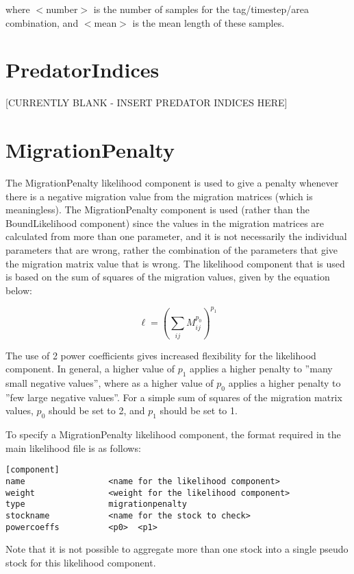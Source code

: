 \documentclass [a4paper, 10pt]{book}
\begin{document}
where $<$number$>$ is the number of samples for the tag/timestep/area combination, and $<$mean$>$ is the mean length of these samples.

\section{PredatorIndices}\label{sec:predatorindex}
[CURRENTLY BLANK - INSERT PREDATOR INDICES HERE]

\section{MigrationPenalty}\label{sec:migpenalty}
The MigrationPenalty likelihood component is used to give a penalty whenever there is a negative migration value from the migration matrices (which is meaningless).  The MigrationPenalty component is used (rather than the BoundLikelihood component) since the values in the migration matrices are calculated from more than one parameter, and it is not necessarily the individual parameters that are wrong, rather the combination of the parameters that give the migration matrix value that is wrong.  The likelihood component that is used is based on the sum of squares of the migration values, given by the equation below:

\begin{equation}\label{eq:migpenalty}
\ell = \left( \sum_{ij}^{} M_{ij}^{p_0} \right)^{p_1}
\end{equation}

\bigskip
The use of 2 power coefficients gives increased flexibility for the likelihood component.  In general, a higher value of $p_1$ applies a higher penalty to ''many small negative values'', where as a higher value of $p_0$ applies a higher penalty to ''few large negative values''.  For a simple sum of squares of the migration matrix values, $p_0$ should be set to 2, and $p_1$ should be set to 1.

\bigskip
To specify a MigrationPenalty likelihood component, the format required in the main likelihood file is as follows:

{\small\begin{verbatim}
[component]
name                 <name for the likelihood component>
weight               <weight for the likelihood component>
type                 migrationpenalty
stockname            <name for the stock to check>
powercoeffs          <p0>  <p1>
\end{verbatim}}

Note that it is not possible to aggregate more than one stock into a single pseudo stock for this likelihood component.
\end{document}
